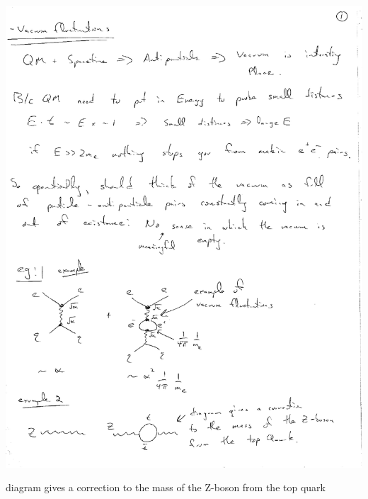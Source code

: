 {\bc
\includegraphics[width=\textwidth]{./ZVacuumFluctionations.pdf}
\ec

diagram gives a correction to the mass of the Z-boson from the top quark





}



